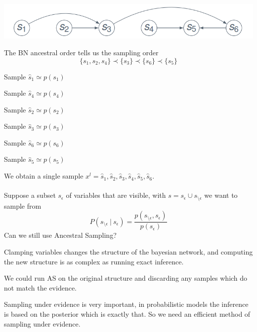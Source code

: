 \documentclass[10pt]{report}
\begin{document}
\begin{center}
	\includegraphics[scale=0.5]{67.png}
\end{center}
The BN ancestral order tells us the sampling order
$$\{s_1,s_2,s_4\}\prec\{s_3\}\prec\{s_6\}\prec\{s_5\}$$\begin{list}{}{}
	\item Sample $\hat{s}_1\simeq p(s_1)$
	\item Sample $\hat{s}_4\simeq p(s_4)$
	\item Sample $\hat{s}_2\simeq p(s_2)$
	\item Sample $\hat{s}_3\simeq p(s_3)$
	\item Sample $\hat{s}_6\simeq p(s_6)$
	\item Sample $\hat{s}_5\simeq p(s_5)$
\end{list}
We obtain a single sample $x^l = \hat{s}_1,\hat{s}_2,\hat{s}_3,\hat{s}_4,\hat{s}_5,\hat{s}_6$.\\\\
Suppose a subset $s_\epsilon$ of variables that are visible, with $s=s_\epsilon\cup s_{\setminus\epsilon}$ we want to sample from $$P(s_{\setminus\epsilon}\:|\:s_\epsilon) = \frac{p(s_{\setminus\epsilon}, s_\epsilon)}{p(s_\epsilon)}$$
Can we still use Ancestral Sampling?\begin{list}{}{}
	\item Clamping variables changes the structure of the bayesian network, and computing the new structure is as complex as running exact inference.
	\item We could run AS on the original structure and discarding any samples which do not match the evidence.
\end{list}
Sampling under evidence is very important, in probabilistic models the inference is based on the posterior which is exactly that. So we need an efficient method of sampling under evidence.
\end{document}
